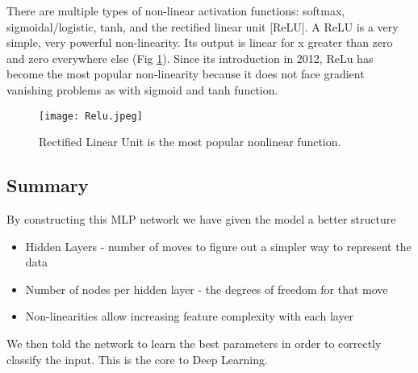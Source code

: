 %
%
%

There are multiple types of non-linear activation functions: softmax, sigmoidal/logistic, tanh, and the rectified linear unit [ReLU].  A ReLU is a very simple, very powerful non-linearity.  Its output is linear for x greater than zero and zero everywhere else (Fig \ref{fig:ReLU}). Since its introduction in 2012, ReLu has become the most popular non-linearity because it does not face gradient vanishing problems as with sigmoid and tanh function.\cite{DataWknd}


\begin{figure}[!h]
 \begin{center}
 \texttt{[image: Relu.jpeg]}
 \caption{Rectified Linear Unit is the most popular nonlinear function.  }
 \label{fig:ReLU}
 \end{center}
 \end{figure}

\subsection{Summary}
By constructing this MLP network we have given the model a better structure 
\begin{itemize}
\item Hidden Layers - number of moves to figure out a simpler way to represent the data
\item Number of nodes per hidden layer - the degrees of freedom for that move
\item Non-linearities allow increasing feature complexity with each layer  
\end{itemize}
We then told the network to learn the best parameters in order to correctly classify the input.
This is the core to Deep Learning.\cite{Udacity} \cite{DataWknd} \cite{playground}

